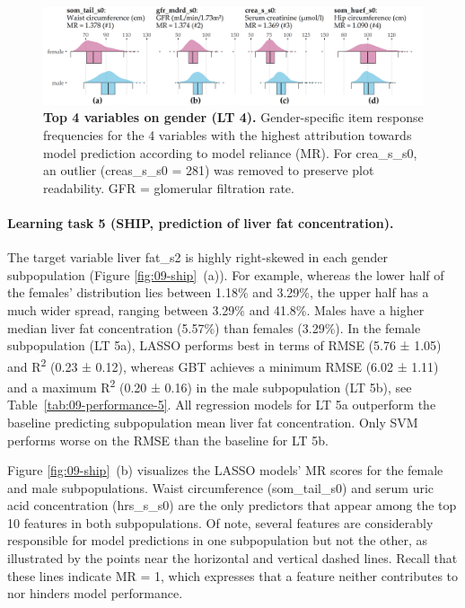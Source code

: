 \documentclass[
  oneside]{book}
\begin{document}
\begin{figure}[htb]

{\centering \includegraphics[width=1\linewidth]{figures/09-lt4-imp-features} 

}

\caption{\textbf{Top 4 variables on gender (LT 4).} Gender-specific item response frequencies for the 4 variables with the highest attribution towards model prediction according to model reliance (MR). For crea\_s\_s0, an outlier (creas\_s\_s0 = 281) was removed to preserve plot readability. GFR = glomerular filtration rate.}\label{fig:09-lt4-imp-features}
\end{figure}

\paragraph*{Learning task 5 (SHIP, prediction of liver fat concentration).}

The target variable liver fat\_s2 is highly right-skewed in each gender subpopulation (Figure \ref{fig:09-ship}~(a)).
For example, whereas the lower half of the females' distribution lies between 1.18\% and 3.29\%, the upper half has a much wider spread, ranging between 3.29\% and 41.8\%.
Males have a higher median liver fat concentration (5.57\%) than females (3.29\%).
In the female subpopulation (LT 5a), LASSO performs best in terms of RMSE (5.76 ± 1.05) and R\textsuperscript{2} (0.23 ± 0.12), whereas GBT achieves a minimum RMSE (6.02 ± 1.11) and a maximum R\textsuperscript{2} (0.20 ± 0.16) in the male subpopulation (LT 5b), see Table~\ref{tab:09-performance-5}.
All regression models for LT 5a outperform the baseline predicting subpopulation mean liver fat concentration.
Only SVM performs worse on the RMSE than the baseline for LT 5b.

Figure \ref{fig:09-ship}~(b) visualizes the LASSO models' MR scores for the female and male subpopulations.
Waist circumference (som\_tail\_s0) and serum uric acid concentration (hrs\_s\_s0) are the only predictors that appear among the top 10 features in both subpopulations.
Of note, several features are considerably responsible for model predictions in one subpopulation but not the other, as illustrated by the points near the horizontal and vertical dashed lines.
Recall that these lines indicate MR = 1, which expresses that a feature neither contributes to nor hinders model performance.
\end{document}
